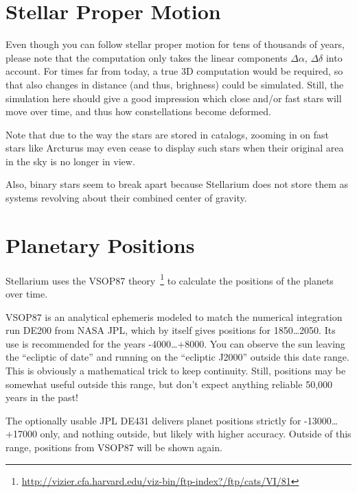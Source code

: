\section{Stellar Proper Motion}
\label{sec:Accuracy:ProperMotion}

Even though you can follow stellar proper motion for tens of thousands of years, 
please note that the computation only takes the linear components $\Delta\alpha$, $\Delta\delta$ into account. 
For times far from today, a true 3D computation would be required, 
so that also changes in distance (and thus, brighness) could be simulated. 
Still, the simulation here should give a good impression which close and/or fast stars 
will move over time, and thus how constellations become deformed.

Note that due to the way the stars are stored in catalogs, zooming in on fast stars like Arcturus 
may even cease to display such stars when their original area in the sky is no longer in view.

Also, binary stars seem to break apart because Stellarium does not store them as systems 
revolving about their combined center of gravity.


\section{Planetary Positions}
\label{sec:Accuracy:Planets}

Stellarium uses the VSOP87 theory~\cite{1988A&A...202..309B}\footnote{\url{http://vizier.cfa.harvard.edu/viz-bin/ftp-index?/ftp/cats/VI/81}}
to calculate the positions of the planets over time.

VSOP87 is an analytical ephemeris modeled to match the numerical
integration run DE200 from NASA JPL, which by itself gives positions for 1850\ldots2050. 
Its use is recommended for the years -4000\ldots+8000. You can observe the sun leaving the ``ecliptic
of date'' and running on the ``ecliptic J2000'' outside this date
range. This is obviously a mathematical trick to keep
continuity. Still, positions may be somewhat useful outside this
range, but don't expect anything reliable 50,000 years in the past! 

The optionally usable JPL DE431 delivers planet positions strictly for
-13000\ldots+17000 only, and nothing outside, but likely with higher accuracy. 
Outside of this range, positions from VSOP87 will be shown again.

